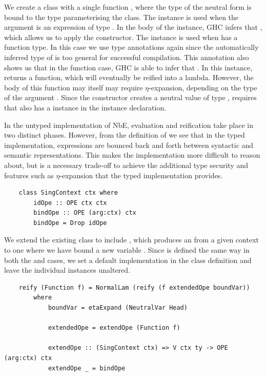 We create a class  with a single function , where the type of the neutral form is bound to the type  parameterising the class. The  instance is used when the argument  is an expression of type . In the body of the instance, GHC infers that , which allows us to apply the  constructor. The \code{:->} instance is used when  has a function type. In this case we use type annotations again since the automatically inferred type of  is too general for successful compilation. This annotation also shows us that in the function case, GHC is able to infer that . In this instance,  returns a function, which will eventually be reified into a lambda. However, the body of this function may itself may require $\eta$-expansion, depending on the type  of the argument . Since the  constructor creates a neutral value of type ,  requires that  also has a  instance in the instance declaration.

In the untyped implementation of NbE, evaluation and reification take place in two distinct phases. However, from the definition of  we see that in the typed implementation, expressions are bounced back and forth between syntactic and semantic representations. This makes the implementation more difficult to reason about, but is a necessary trade-off to achieve the additional type security and features such as $\eta$-expansion that the typed implementation provides.

\begin{lstlisting}
    class SingContext ctx where
        idOpe :: OPE ctx ctx
        bindOpe :: OPE (arg:ctx) ctx
        bindOpe = Drop idOpe
\end{lstlisting}

We extend the existing class  to include , which produces an  from a given context  to one where we have bound a new variable . Since  is defined the same way in both the  and \code{(:)} cases, we set a default implementation in the class definition and leave the individual instances unaltered. 

\begin{lstlisting}
    reify (Function f) = NormalLam (reify (f extendedOpe boundVar)) 
        where
            boundVar = etaExpand (NeutralVar Head)

            extendedOpe = extendOpe (Function f)

            extendOpe :: (SingContext ctx) => V ctx ty -> OPE (arg:ctx) ctx
            extendOpe _ = bindOpe 
\end{lstlisting}

